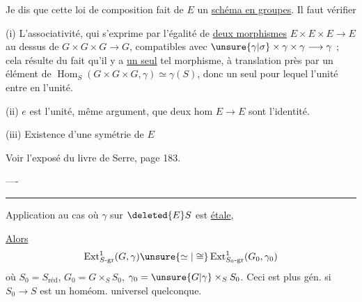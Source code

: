 Je dis que cette loi de composition fait de $E$ un \uline{schéma en groupes}. Il faut vérifier

(i) L'associativité, qui s'exprime par l'égalité de \uline{deux morphismes} $E\times E\times E\longrightarrow E$ au dessus de $G\times G\times G\longrightarrow G$, compatibles avec $\unsure{\gamma|\sigma}\times\gamma\times\gamma\longrightarrow\gamma$ ; cela résulte du fait qu'il y a \uline{un seul} tel morphisme, à translation près par un élément de $\operatorname{Hom}_S(G\times G\times G,\gamma)\simeq\gamma(S)$, donc un seul pour lequel l'unité entre en l'unité.

(ii) $e$ est l'unité, même argument,   que deux hom $E\longrightarrow E$ sont l'identité.

(iii) Existence d'une symétrie de $E$

Voir l'exposé du livre de Serre, page 183.

\noindent ----

\noindent\rule{.72\linewidth}{.3pt}

Application au cas où $\gamma$ sur $\deleted{E}S$ est \uline{étale}, 

\uline{Alors}
\[
\operatorname{Ext}^{1}_{S\text{-gr}}(G,\gamma)\unsure{\simeq|\cong}\operatorname{Ext}^{1}_{S_0\text{-gr}}(G_0,\gamma_0)
\]
où $S_0=S_{\mathrm{réd}}$, $G_0=G\times_S S_0$, $\gamma_0=\unsure{G|\gamma}\times_S S_0$. Ceci est plus gén. si $S_0\longrightarrow S$ est un homéom. universel quelconque. 

